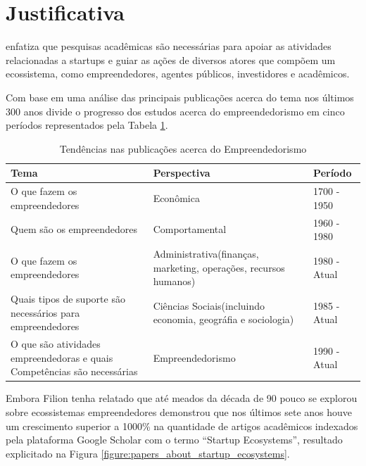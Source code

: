 \section{Justificativa}
\label{section:justificativa}

 enfatiza que pesquisas acadêmicas são necessárias para apoiar as atividades relacionadas a startups e guiar as ações de diversos atores que compõem um ecossistema, como empreendedores, agentes públicos, investidores e acadêmicos.

Com base em uma análise das principais publicações acerca do tema nos últimos 300 anos  divide o progresso dos estudos acerca do empreendedorismo em cinco períodos representados pela Tabela \ref{table:tendencias_nas_publicacoes_acerca_do_empreendedorismo}.

\begin{table}[!htb]
	\centering
	\begin{tabular}{ | p{6cm} | p{6cm} | p{3cm} | }
		\hline
		Tema & Perspectiva & Período \\ \hline
		O que fazem os empreendedores & Econômica & 1700 - 1950 \\ \hline
		Quem são os empreendedores & Comportamental & 1960 - 1980 \\ \hline
		O que fazem os empreendedores & Administrativa(finanças, marketing, operações, recursos humanos) & 1980 - Atual \\ \hline
		Quais tipos de suporte são necessários para empreendedores & Ciências Sociais(incluindo economia, geográfia e sociologia) & 1985 - Atual \\ \hline
		O que são atividades empreendedoras e quais Competências são necessárias & Empreendedorismo & 1990 - Atual \\ \hline
	\end{tabular}
	\caption{Tendências nas publicações acerca do Empreendedorismo}
	\label{table:tendencias_nas_publicacoes_acerca_do_empreendedorismo}
\end{table}

Embora Filion tenha relatado que até meados da década de 90 pouco se explorou sobre ecossistemas empreendedores   demonstrou que nos últimos sete anos houve um crescimento superior a 1000\% na quantidade de artigos acadêmicos indexados pela plataforma Google Scholar com o termo ``Startup Ecosystems'', resultado explicitado na Figura \ref{figure:papers_about_startup_ecosystems}.

